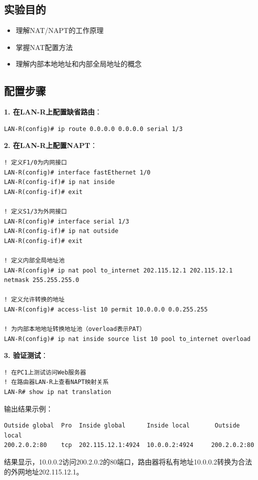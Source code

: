 \documentclass[12pt,a4paper]{ctexart}
\begin{document}
\subsection{实验目的}

\begin{itemize}[leftmargin=2em,itemsep=0pt]
    \item 理解NAT/NAPT的工作原理
    \item 掌握NAT配置方法
    \item 理解内部本地地址和内部全局地址的概念
\end{itemize}

\subsection{配置步骤}

\begin{cmdbox}
\textbf{1. 在LAN-R上配置缺省路由}：
\begin{lstlisting}
LAN-R(config)# ip route 0.0.0.0 0.0.0.0 serial 1/3
\end{lstlisting}

\textbf{2. 在LAN-R上配置NAPT}：
\begin{lstlisting}
! 定义F1/0为内网接口
LAN-R(config)# interface fastEthernet 1/0
LAN-R(config-if)# ip nat inside
LAN-R(config-if)# exit

! 定义S1/3为外网接口
LAN-R(config)# interface serial 1/3
LAN-R(config-if)# ip nat outside
LAN-R(config-if)# exit

! 定义内部全局地址池
LAN-R(config)# ip nat pool to_internet 202.115.12.1 202.115.12.1 netmask 255.255.255.0

! 定义允许转换的地址
LAN-R(config)# access-list 10 permit 10.0.0.0 0.0.255.255

! 为内部本地地址转换地址池（overload表示PAT）
LAN-R(config)# ip nat inside source list 10 pool to_internet overload
\end{lstlisting}

\textbf{3. 验证测试}：
\begin{lstlisting}
! 在PC1上测试访问Web服务器
! 在路由器LAN-R上查看NAPT映射关系
LAN-R# show ip nat translation
\end{lstlisting}

输出结果示例：
\begin{lstlisting}
Outside global  Pro  Inside global      Inside local       Outside local
200.2.0.2:80    tcp  202.115.12.1:4924  10.0.0.2:4924     200.2.0.2:80
\end{lstlisting}

结果显示，10.0.0.2访问200.2.0.2的80端口，路由器将私有地址10.0.0.2转换为合法的外网地址202.115.12.1。
\end{cmdbox}
\end{document}
